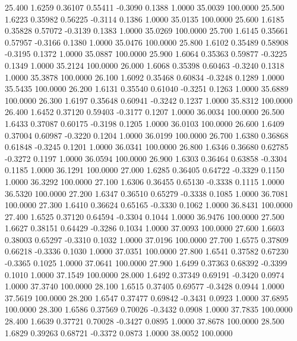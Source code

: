   25.400   1.6259   0.36107   0.55411  -0.3090   0.1388   1.0000  35.0039 100.0000
  25.500   1.6223   0.35982   0.56225  -0.3114   0.1386   1.0000  35.0135 100.0000
  25.600   1.6185   0.35828   0.57072  -0.3139   0.1383   1.0000  35.0269 100.0000
  25.700   1.6145   0.35661   0.57957  -0.3166   0.1380   1.0000  35.0476 100.0000
  25.800   1.6102   0.35489   0.58908  -0.3195   0.1372   1.0000  35.0887 100.0000
  25.900   1.6064   0.35363   0.59877  -0.3225   0.1349   1.0000  35.2124 100.0000
  26.000   1.6068   0.35398   0.60463  -0.3240   0.1318   1.0000  35.3878 100.0000
  26.100   1.6092   0.35468   0.60834  -0.3248   0.1289   1.0000  35.5435 100.0000
  26.200   1.6131   0.35540   0.61040  -0.3251   0.1263   1.0000  35.6889 100.0000
  26.300   1.6197   0.35648   0.60941  -0.3242   0.1237   1.0000  35.8312 100.0000
  26.400   1.6452   0.37120   0.59403  -0.3177   0.1207   1.0000  36.0034 100.0000
  26.500   1.6433   0.37087   0.60175  -0.3198   0.1205   1.0000  36.0103 100.0000
  26.600   1.6409   0.37004   0.60987  -0.3220   0.1204   1.0000  36.0199 100.0000
  26.700   1.6380   0.36868   0.61848  -0.3245   0.1201   1.0000  36.0341 100.0000
  26.800   1.6346   0.36680   0.62785  -0.3272   0.1197   1.0000  36.0594 100.0000
  26.900   1.6303   0.36464   0.63858  -0.3304   0.1185   1.0000  36.1291 100.0000
  27.000   1.6285   0.36405   0.64722  -0.3329   0.1150   1.0000  36.3292 100.0000
  27.100   1.6306   0.36455   0.65130  -0.3338   0.1115   1.0000  36.5320 100.0000
  27.200   1.6347   0.36510   0.65279  -0.3338   0.1085   1.0000  36.7081 100.0000
  27.300   1.6410   0.36624   0.65165  -0.3330   0.1062   1.0000  36.8431 100.0000
  27.400   1.6525   0.37120   0.64594  -0.3304   0.1044   1.0000  36.9476 100.0000
  27.500   1.6627   0.38151   0.64429  -0.3286   0.1034   1.0000  37.0093 100.0000
  27.600   1.6603   0.38003   0.65297  -0.3310   0.1032   1.0000  37.0196 100.0000
  27.700   1.6575   0.37809   0.66218  -0.3336   0.1030   1.0000  37.0351 100.0000
  27.800   1.6541   0.37582   0.67230  -0.3365   0.1025   1.0000  37.0641 100.0000
  27.900   1.6499   0.37363   0.68392  -0.3399   0.1010   1.0000  37.1549 100.0000
  28.000   1.6492   0.37349   0.69191  -0.3420   0.0974   1.0000  37.3740 100.0000
  28.100   1.6515   0.37405   0.69577  -0.3428   0.0944   1.0000  37.5619 100.0000
  28.200   1.6547   0.37477   0.69842  -0.3431   0.0923   1.0000  37.6895 100.0000
  28.300   1.6586   0.37569   0.70026  -0.3432   0.0908   1.0000  37.7835 100.0000
  28.400   1.6639   0.37721   0.70028  -0.3427   0.0895   1.0000  37.8678 100.0000
  28.500   1.6829   0.39263   0.68721  -0.3372   0.0873   1.0000  38.0052 100.0000
